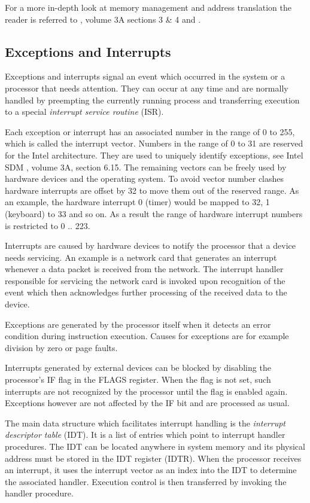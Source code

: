 For a more in-depth look at memory management and address translation the reader
is referred to \cite{IntelSDM}, volume 3A sections 3 \& 4 and
\cite{Drepper07whatevery}.

\subsection{Exceptions and Interrupts}\label{subsec:exceptions-interrupts}
Exceptions and interrupts signal an event
which occurred in the system or a processor that needs attention. They can
occur at any time and are normally handled by preempting the currently running
process and transferring execution to a special \emph{interrupt service routine}
(ISR).

Each exception or interrupt has an associated number in the range of 0 to 255,
which is called the interrupt vector. Numbers in the
range of 0 to 31 are reserved for the Intel architecture. They are used to
uniquely identify exceptions, see Intel SDM \cite{IntelSDM}, volume 3A, section
6.15.  The remaining vectors can be freely used by hardware devices and the
operating system. To avoid vector number clashes hardware interrupts are offset
by 32 to move them out of the reserved range. As an example, the hardware
interrupt 0 (timer) would be mapped to 32, 1 (keyboard) to 33 and so on. As a
result the range of hardware interrupt numbers is restricted to 0 .. 223.

Interrupts are caused by hardware devices to notify the processor
that a device needs servicing. An example is a network card that generates an
interrupt whenever a data packet is received from the network. The interrupt
handler responsible for servicing the network card is invoked upon recognition
of the event which then acknowledges further processing of the received data to
the device.

Exceptions are generated by the processor itself when it detects an error
condition during instruction execution. Causes for exceptions are for example
division by zero or page faults.

Interrupts generated by external devices can be blocked by disabling the
processor's IF flag in the FLAGS register. When the flag
is not set, such interrupts are not recognized by the processor until the flag
is enabled again.  Exceptions however are not affected by the IF bit and are
processed as usual.

The main data structure which facilitates interrupt handling is the
\emph{interrupt descriptor table} (IDT). It is a list of entries
which point to interrupt handler procedures. The IDT can be located anywhere in
system memory and its physical address must be stored in the IDT register
(IDTR). When the processor receives an interrupt, it uses the
interrupt vector as an index into the IDT to determine the associated handler.
Execution control is then transferred by invoking the handler procedure.

